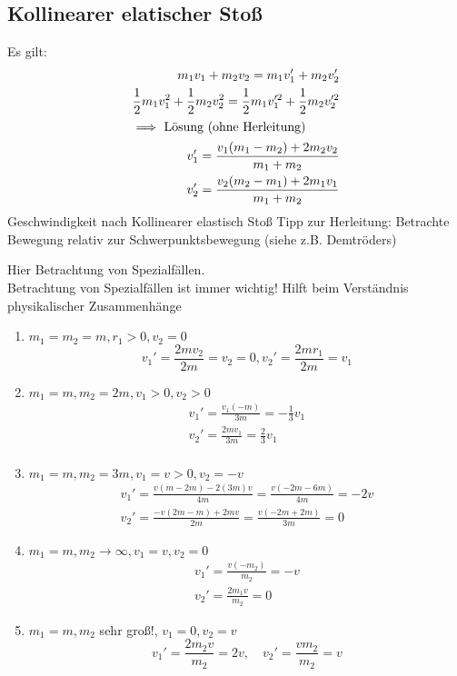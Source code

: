 \documentclass[a4paper]{scrartcl}
\theoremstyle{definition}
\theoremstyle{plain}
\theoremstyle{plain}
\theoremstyle{remark}
\theoremstyle{remark}
\theoremstyle{remark}
\begin{document}
\subsection{Kollinearer elatischer Stoß}
\label{sec-7-1}
Es gilt:
\begin{align*}
m_1 v_1 + m_2 v_2 = m_1 v_1' + m_2 v_2' \\
\frac{1}{2} m_1 v_1^2 + \frac{1}{2} m_2 v_2^2 = \frac{1}{2} m_1 v_1^{\prime 2} + \frac{1}{2} m_2 v_2^{\prime 2} \\
\intertext{$\implies$ Lösung (ohne Herleitung)}
v_1' = \frac{v_1(m_1 - m_2) + 2m_2 v_2}{m_1 + m_2} \\
v_2' = \frac{v_2(m_2 - m_1) + 2m_1 v_1}{m_1 + m_2}
\end{align*}
Geschwindigkeit nach Kollinearer elastisch Stoß
Tipp zur Herleitung: Betrachte Bewegung relativ zur Schwerpunktsbewegung (siehe z.B. Demtröders)

Hier Betrachtung von Spezialfällen. \\
   Betrachtung von Spezialfällen ist immer wichtig! Hilft beim Verständnis physikalischer Zusammenhänge
\begin{enumerate}
\item $m_1 = m_2 = m, r_1 > 0, v_2 = 0$
      \[v_1' = \frac{2 m v_2}{2 m} = v_2 = 0, v_2' = \frac{2m r_1}{2 m} = v_1\]
\item $m_1 = m, m_2 = 2 m, v_1 > 0, v_2 > 0$
\begin{align*}
v_1' = \frac{v_1 (- m)}{3 m} = - \frac{1}{3}v_1 \\
v_2' = \frac{2m v_1}{3 m} = \frac{2}{3}v_1 \\
\end{align*}
\item $m_1 = m, m_2 = 3m, v_1 = v > 0, v_2 = -v$
\begin{align*}
v_1' = \frac{v(m - 2m) - 2(3m) v}{4m} = \frac{v(-2m - 6m)}{4m} = -2v \\
v_2' = \frac{-v(2m - m) + 2mv}{2m} = \frac{v(-2m + 2m)}{3m} = 0
\end{align*}
\item $m_1 = m, m_2 \to \infty, v_1 = v, v_2 = 0$
\begin{align*}
v_1' = \frac{v(-m_2)}{m_2} = -v \tag{da $m_1$ vernachlässigbar} \\
v_2' = \frac{2 m_1 v}{m_2} = 0 \tag{da $m_1 \ll m_2$}
\end{align*}
\item $m_1 = m, m_2$ sehr groß!, $v_1 = 0, v_2 = v$
      \[v_1' = \frac{2m_2 v}{m_2} = 2v,\quad v_2' = \frac{v m_2}{m_2} = v\]
\end{enumerate}
\end{document}
